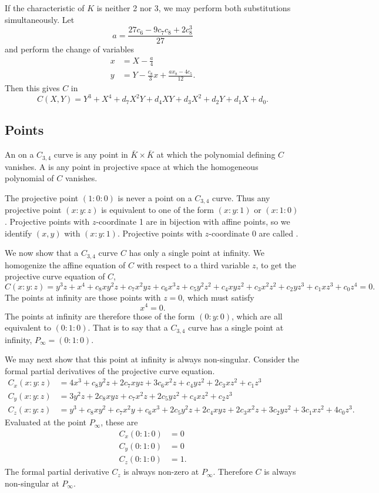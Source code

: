 If the characteristic of $K$ is neither 2 nor 3, we may perform both substitutions simultaneously. Let
\[ a = \frac {27c_6 - 9c_7c_8 + 2c_8^3} {27} \]
and perform the change of variables
\begin{align*}
  x &= X - \frac a 4 \\
  y &= Y - \frac {c_8} {3} x + \frac {ax_8 - 4c_5} {12}.
\end{align*}
Then this gives $C$ in 
\begin{equation}
  \label{eq_c34_short}
  C(X,Y) = Y^3 + X^4 + d_7X^2Y + d_4XY + d_3X^2 + d_2Y + d_1X + d_0.
\end{equation}

\subsection{Points}

An  on a $C_{3,4}$ curve is any point in $\bar K \times \bar K$
at which the polynomial defining $C$ vanishes.
A  is any point in projective space at which the homogeneous polynomial of $C$ vanishes.

The projective point $(1 : 0 : 0)$ is never a point on a $C_{3,4}$ curve.
Thus any projective point $(x:y:z)$ is equivalent to one of the form $(x:y:1)$ or $(x:1:0)$.
Projective points with $z$-coordinate 1 are in bijection with affine points,
so we identify $(x,y)$ with $(x:y:1)$.
Projective points with $z$-coordinate 0 are called .

We now show that a $C_{3,4}$ curve $C$ has only a single point at infinity.
We homogenize the affine equation of $C$ with respect to a third variable $z$,
to get the projective curve equation of $C$,
  \[ C(x:y:z) = y^3z + x^4 + c_8xy^2z + c_7x^2yz + c_6x^3z + c_5y^2z^2 + c_4xyz^2 + c_3x^2z^2 + c_2yz^3 + c_1xz^3 + c_0z^4 = 0. \]
The points at infinity are those points with $z = 0$, which must satisfy
  \[ x^4 = 0. \]
The points at infinity are therefore those of the form $(0 : y : 0)$, which are all equivalent to $(0 : 1 : 0)$.
That is to say that a $C_{3,4}$ curve has a single point at infinity, $P_\infty = (0 : 1 : 0)$.

We may next show that this point at infinity is always non-singular.
Consider the formal partial derivatives of the projective curve equation.
\begin{align*}
  C_x(x:y:z) &= 4x^3 + c_8y^2z + 2c_7xyz + 3c_6x^2z + c_4yz^2 + 2c_3xz^2 + c_1z^3 \\
  C_y(x:y:z) &= 3y^2z + 2c_8xyz + c_7x^2z + 2c_5yz^2 + c_4xz^2 + c_2z^3 \\
  C_z(x:y:z) &= y^3 + c_8xy^2 + c_7x^2y + c_6x^3 + 2c_5y^2z + 2c_4xyz + 2c_3x^2z + 3c_2yz^2 + 3c_1xz^2 + 4c_0z^3.
\end{align*}
Evaluated at the point $P_\infty$, these are
\begin{align*}
  C_x(0:1:0) &= 0 \\
  C_y(0:1:0) &= 0 \\
  C_z(0:1:0) &= 1 .
\end{align*}
The formal partial derivative $C_z$ is always non-zero at $P_\infty$.
Therefore $C$ is always non-singular at $P_\infty$.

